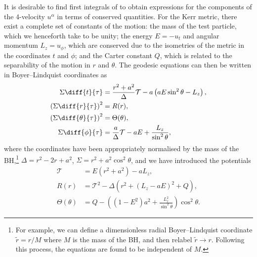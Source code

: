 It is desirable to find first integrals of  to obtain expressions for the components of the 4-velocity $u^\alpha$ in terms of conserved quantities. For the Kerr metric, there exist a complete set of constants of the motion: the mass of the test particle, which we henceforth take to be unity; the energy $E = -u_t$ and angular momentum $L_z = u_\phi$, which are conserved due to the isometries of the metric in the coordinates $t$ and $\phi$; and the Carter constant $Q$, which is related to the separability of the motion in $r$ and $\theta$. The geodesic equations can then be written in Boyer--Lindquist coordinates as \citep{schmidt_celestial_2002}
\begin{subequations}\label{eq:kerr-geodesics}\begin{align}
\label{eq:kerr-geodesics-t}
\Sigma \diff{t}{\tau} &= \frac{r^2 + a^2}{\Delta}\mathcal{T} - a\left(aE\sin^2\theta-L_z\right),\\
\left(\Sigma \diff{r}{\tau}\right)^2 &= R(r),\\
\left(\Sigma \diff{\theta}{\tau}\right)^2 &= \Theta(\theta),\\
\Sigma \diff{\phi}{\tau} &= \frac{a}{\Delta}\mathcal{T} - aE + \frac{L_z}{\sin^2\theta},
\end{align}\end{subequations}
where the coordinates have been appropriately normalised by the mass of the BH,\footnote{For example, we can define a dimensionless radial Boyer--Lindquist coordinate $\tilde{r}=r/M$ where $M$ is the mass of the BH, and then relabel $\tilde{r} \rightarrow r$. Following this process, the equations are found to be independent of $M$.} $\Delta = r^2 - 2 r + a^2$, $\Sigma = r^2 + a^2 \cos^2\theta$, and we have introduced the potentials
\begin{align}
\mathcal{T} &= E(r^2+a^2)-aL_z,\\
R(r) &= \mathcal{T}^2 - \Delta\left(r^2+(L_z-aE)^2+Q\right),\\
\Theta(\theta) &= Q - \left((1-E^2)a^2 + \frac{L_z^2}{\sin^2\theta}\right)\cos^2\theta.
\end{align}

